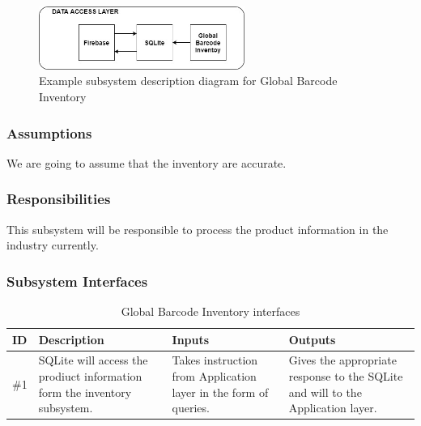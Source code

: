 \begin{figure}[h!]
	\centering
 	\includegraphics[width=0.60\textwidth]{images/DS.jpg}
 \caption{Example subsystem description diagram for Global Barcode Inventory}
\end{figure}

\subsubsection{Assumptions}
We are going to assume that the inventory are accurate.

\subsubsection{Responsibilities}
This subsystem will be responsible to process the product information in the industry currently. 

\subsubsection{Subsystem Interfaces}
\begin {table}[H]
\caption {Global Barcode Inventory interfaces} 
\begin{center}
    \begin{tabular}{ | p{1cm} | p{6cm} | p{3cm} | p{3cm} |}
    \hline
    ID & Description & Inputs & Outputs \\ \hline
    \#1 & SQLite will access the prodiuct information form the inventory subsystem. & Takes instruction from Application layer in the form of queries. & Gives the appropriate response to the SQLite and will to the Application layer.\\ \hline
    \end{tabular}
\end{center}
\end{table}

